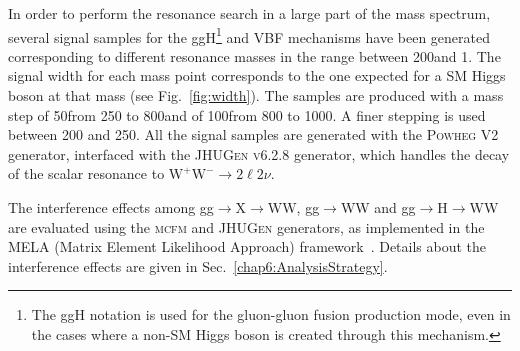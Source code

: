 In order to perform the resonance search in a large part of the mass spectrum, several signal samples for the ggH\footnote{The ggH notation is used for the gluon-gluon fusion production mode, even in the cases where a non-SM Higgs boson is created through this mechanism.} and VBF mechanisms have been generated corresponding to different resonance masses in the range between 200\GeV and 1\TeV. The signal width for each mass point corresponds to the one expected for a SM Higgs boson at that mass (see Fig.~\ref{fig:width}). The samples are produced with a mass step of 50\GeV from 250 to 800\GeV and of 100\GeV from 800 to 1000\GeV. A finer stepping is used between 200 and 250\GeV. All the signal samples are generated with the \textsc{Powheg V2} generator, interfaced with the \textsc{JHUGen v6.2.8} generator, which handles the decay of the scalar resonance to $\mathrm{W^+ W^-}\to2\ell2\nu$.

The interference effects among gg$\to$X$\to$WW, gg$\to$WW and gg$\to$H$\to$WW are evaluated using the  \textsc{mcfm} and \textsc{JHUGen} generators, as implemented in the MELA (Matrix Element Likelihood Approach) framework~\cite{JHUGen}. Details about the interference effects are given in Sec.~\ref{chap6:AnalysisStrategy}.
